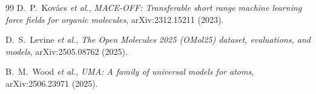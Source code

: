 \documentclass[11pt,a4paper]{article}
\begin{document}
\begin{thebibliography}{99}
 D.~P.~Kov\'acs \emph{et al.},
  \emph{MACE-OFF: Transferable short range machine learning force fields for
  organic molecules}, arXiv:2312.15211 (2023).

 D.~S.~Levine \emph{et al.},
  \emph{The Open Molecules 2025 (OMol25) dataset, evaluations, and models},
  arXiv:2505.08762 (2025).

 B.~M.~Wood \emph{et al.},
  \emph{UMA: A family of universal models for atoms}, arXiv:2506.23971 (2025).

\end{thebibliography}
\end{document}
